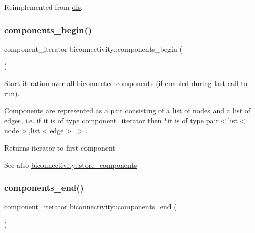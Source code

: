 Reimplemented from \mbox{\hyperlink{classdfs_a1af70060897529e67910f589b047e576}{dfs}}.

\mbox{\label{classbiconnectivity_ac0b7253533edc3f1412f771cb35bf04a}} 
\subsubsection{\texorpdfstring{components\+\_\+begin()}{components\_begin()}}
{\footnotesize\ttfamily component\+\_\+iterator biconnectivity\+::components\+\_\+begin (\begin{DoxyParamCaption}{ }\end{DoxyParamCaption})\hspace{0.3cm}{\ttfamily [inline]}}



Start iteration over all biconnected components (if enabled during last call to run). 

Components are represented as a pair consisting of a list of nodes and a list of edges, i.\+e. if it is of type component\+\_\+iterator then $\ast$it is of type pair$<$list$<$node$>$,list$<$edge$>$ $>$.

\begin{DoxyReturn}{Returns}
iterator to first component 
\end{DoxyReturn}
\begin{DoxySeeAlso}{See also}
\mbox{\hyperlink{classbiconnectivity_a1234e7a70f50fd60c855529fe6fa4acb}{biconnectivity\+::store\+\_\+components}} 
\end{DoxySeeAlso}
\mbox{\label{classbiconnectivity_a0bd1c70975e664174e591efd64f8dc71}} 
\subsubsection{\texorpdfstring{components\+\_\+end()}{components\_end()}}
{\footnotesize\ttfamily component\+\_\+iterator biconnectivity\+::components\+\_\+end (\begin{DoxyParamCaption}{ }\end{DoxyParamCaption})\hspace{0.3cm}{\ttfamily [inline]}}



